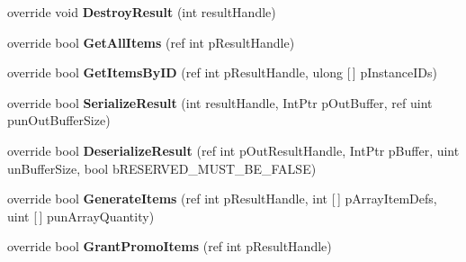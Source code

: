 \begin{DoxyCompactItemize}
\item 
\mbox{\label{class_valve_1_1_steamworks_1_1_c_steam_inventory_ab173ea3af695a4e57548e035e9ff10dc}} 
override void {\bfseries Destroy\+Result} (int result\+Handle)
\item 
\mbox{\label{class_valve_1_1_steamworks_1_1_c_steam_inventory_a380c6687b561e9e61b4a570870f047d7}} 
override bool {\bfseries Get\+All\+Items} (ref int p\+Result\+Handle)
\item 
\mbox{\label{class_valve_1_1_steamworks_1_1_c_steam_inventory_a72993ddaf59131f7a8cb4bfd8e29f54c}} 
override bool {\bfseries Get\+Items\+By\+ID} (ref int p\+Result\+Handle, ulong \mbox{[}$\,$\mbox{]} p\+Instance\+I\+Ds)
\item 
\mbox{\label{class_valve_1_1_steamworks_1_1_c_steam_inventory_a4693d0ba64e65fad7049b86c18200d29}} 
override bool {\bfseries Serialize\+Result} (int result\+Handle, Int\+Ptr p\+Out\+Buffer, ref uint pun\+Out\+Buffer\+Size)
\item 
\mbox{\label{class_valve_1_1_steamworks_1_1_c_steam_inventory_a0e8c9b0a27bac838d77d832f6a8dd728}} 
override bool {\bfseries Deserialize\+Result} (ref int p\+Out\+Result\+Handle, Int\+Ptr p\+Buffer, uint un\+Buffer\+Size, bool b\+R\+E\+S\+E\+R\+V\+E\+D\+\_\+\+M\+U\+S\+T\+\_\+\+B\+E\+\_\+\+F\+A\+L\+SE)
\item 
\mbox{\label{class_valve_1_1_steamworks_1_1_c_steam_inventory_aca960d592f0a4324afed19141ff4e1e0}} 
override bool {\bfseries Generate\+Items} (ref int p\+Result\+Handle, int \mbox{[}$\,$\mbox{]} p\+Array\+Item\+Defs, uint \mbox{[}$\,$\mbox{]} pun\+Array\+Quantity)
\item 
\mbox{\label{class_valve_1_1_steamworks_1_1_c_steam_inventory_a4d221e6b00e37e9ebd60fbbbbad997a3}} 
override bool {\bfseries Grant\+Promo\+Items} (ref int p\+Result\+Handle)
\item 
\mbox{\label{class_valve_1_1_steamworks_1_1_c_steam_inventory_a11cc0ae7710fa4f49b1349a836eedc49}} 

\end{DoxyCompactItemize}
